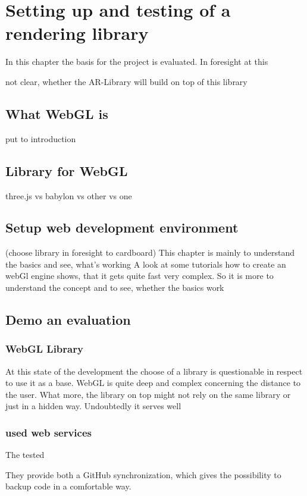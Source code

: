 \chapter{Setting up and testing of a rendering library}

In this chapter the basis for the project is evaluated. In foresight at this 

not clear, whether the AR-Library will build on top of this library


\section{What WebGL is}
put to introduction

\section{Library for WebGL}
three.js vs babylon vs other vs one

\section{Setup web development environment}




(choose library in foresight to cardboard)
This chapter is mainly to understand the basics and see, what’s working
A look at some tutorials how to create an webGl engine shows, that it gets quite fast very complex.
So it is more to understand the concept and to see, whether the basics work



 

\section{Demo an evaluation}

\subsection*{WebGL Library}

At this state of the development the choose of a library is questionable in respect to use it as a base. WebGL is quite deep and complex concerning the distance to the user. What more, the library on top might not rely on the same library or just in a hidden way.
Undoubtedly it serves well 


\subsection*{used web services}

The tested 

They provide both a GitHub synchronization, which gives the possibility to backup code in a comfortable way.